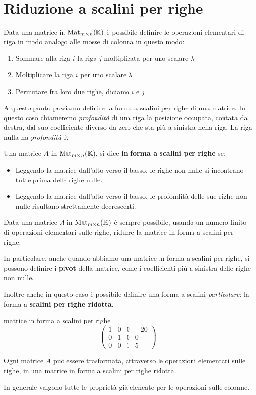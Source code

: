 \section{Riduzione a scalini per righe}
Data una matrice in $\operatorname{Mat}_{m \times n}(\mathbb{K})$ è possibile definire le
operazioni elementari di riga in modo analogo alle mosse di colonna in questo
modo:
\begin{enumerate}
	\item Sommare alla riga $i$ la riga $j$ moltiplicata per uno scalare $\lambda$
	\item Moltiplicare la riga $i$ per uno scalare $\lambda$
	\item Permutare fra loro due righe, diciamo $i$ e $j$
\end{enumerate}
A questo punto possiamo definire la forma a scalini per righe di una matrice.
In questo caso chiameremo \emph{profondità} di una riga la posizione occupata,
contata da destra, dal suo coefficiente diverso da zero che sta più a sinistra
nella riga. La riga nulla ha \emph{profondità} 0.

\begin{definition}
	Una matrice $A$ in $\operatorname{Mat}_{m \times n}(\mathbb{K})$, si dice \textbf{in forma
		a scalini per righe} se:
	\begin{itemize}
		\item Leggendo la matrice dall'alto verso il basso, le righe non nulle si
		      incontrano tutte prima delle righe nulle.
		\item Leggendo la matrice dall'alto verso il basso, le profondità
		      delle sue righe non nulle risultano strettamente decrescenti.
	\end{itemize}
\end{definition}

\begin{theorem}
	Data una matrice $A$ in $\operatorname{Mat}_{m \times n}(\mathbb{K})$ è sempre possibile,
	usando un numero finito di operazioni elementari sulle righe, ridurre la
	matrice in forma a scalini per righe.
\end{theorem}

In particolare, anche quando abbiamo una matrice in forma a scalini per righe, si
possono definire i \textbf{pivot} della matrice, come i coefficienti più a
sinistra delle righe non nulle.

Inoltre anche in questo caso è possibile definire una forma a scalini
\emph{particolare}: la forma a \textbf{scalini per righe ridotta}.

\begin{example}
	matrice in forma a scalini per righe
	\[
		\begin{pmatrix}
			1 & 0 & 0 & -20 \\
			0 & 1 & 0 & 0   \\
			0 & 0 & 1 & 5
		\end{pmatrix}
	\]
\end{example}

\begin{corollary}
	Ogni matrice $A$ può essere trasformata, attraverso le operazioni elementari
	sulle righe, in una matrice in forma a scalini per righe ridotta.
\end{corollary}

In generale valgono tutte le proprietà già elencate per le operazioni sulle
colonne.

